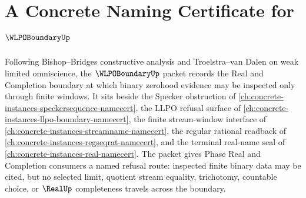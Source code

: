 \chapter{A Concrete Naming Certificate for $\WLPOBoundaryUp$}
\label{ch:concrete-instances-wlpo-boundary-namecert}

Following Bishop--Bridges constructive analysis and Troelstra--van Dalen on weak limited omniscience, the $\WLPOBoundaryUp$ packet records the Real and Completion boundary at which binary zerohood evidence may be inspected only through finite windows. It sits beside the Specker obstruction of \autoref{ch:concrete-instances-speckersequence-namecert}, the LLPO refusal surface of \autoref{ch:concrete-instances-llpo-boundary-namecert}, the finite stream-window interface of \autoref{ch:concrete-instances-streamname-namecert}, the regular rational readback of \autoref{ch:concrete-instances-regseqrat-namecert}, and the terminal real-name seal of \autoref{ch:concrete-instances-real-namecert}. The packet gives Phase Real and Completion consumers a named refusal route: inspected finite binary data may be cited, but no selected limit, quotient stream equality, trichotomy, countable choice, or $\RealUp$ completeness travels across the boundary.

